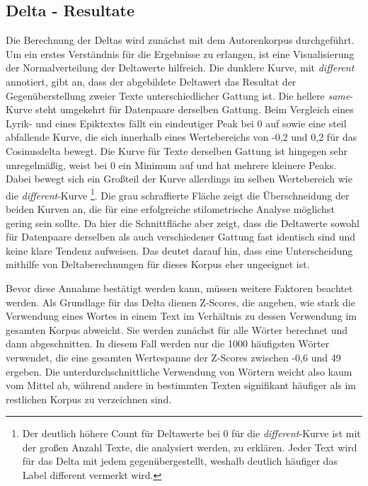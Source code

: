 \documentclass[a4paper,10p]{article}
\begin{document}
\subsection{Delta - Resultate}

Die Berechnung der Deltas wird zunächst mit dem Autorenkorpus durchgeführt. Um ein erstes Verständnis für die Ergebnisse zu erlangen, ist eine Visualisierung der Normalverteilung der Deltawerte hilfreich. Die dunklere Kurve, mit \textit{different} annotiert, gibt an, dass der abgebildete Deltawert das Resultat der Gegenüberstellung zweier Texte unterschiedlicher Gattung ist. Die hellere \textit{same}-Kurve steht umgekehrt für Datenpaare derselben Gattung. Beim Vergleich eines Lyrik- und eines Epiktextes fällt ein eindeutiger Peak bei 0 auf sowie eine steil abfallende Kurve, die sich innerhalb eines Wertebereichs von -0,2 und 0,2 für das Cosinusdelta bewegt. Die Kurve für Texte derselben Gattung ist hingegen sehr unregelmäßig, weist bei 0 ein Minimum auf und hat mehrere kleinere Peaks. Dabei bewegt sich ein Großteil der Kurve allerdings im selben Wertebereich wie die \textit{different}-Kurve \footnote{Der deutlich höhere Count für Deltawerte bei 0 für die \textit{different}-Kurve ist mit der großen Anzahl Texte, die analysiert werden, zu erklären. Jeder Text wird für das Delta mit jedem gegenübergestellt, weshalb deutlich häufiger das Label \glqq different \grqq vermerkt wird.}. Die grau schraffierte Fläche zeigt die Überschneidung der beiden Kurven an, die für eine erfolgreiche stilometrische Analyse möglichst gering sein sollte. Da hier die Schnittfläche aber zeigt, dass die Deltawerte sowohl für Datenpaare derselben als auch verschiedener Gattung fast identisch sind und keine klare Tendenz aufweisen. Das deutet darauf hin, dass eine Unterscheidung mithilfe von Deltaberechnungen für dieses Korpus eher ungeeignet ist. \par 

Bevor diese Annahme bestätigt werden kann, müssen weitere Faktoren beachtet werden. Als Grundlage für das Delta dienen Z-Scores, die angeben, wie stark die Verwendung eines Wortes in einem Text im Verhältnis zu dessen Verwendung im gesamten Korpus abweicht. Sie werden zunächst für alle Wörter berechnet und dann abgeschnitten. In diesem Fall werden nur die 1000 häufigsten Wörter verwendet, die eine gesamten Wertespanne der Z-Scores zwischen -0,6 und 49 ergeben. Die unterdurchschnittliche Verwendung von Wörtern weicht also kaum vom Mittel ab, während andere in bestimmten Texten signifikant häufiger als im restlichen Korpus zu verzeichnen sind. \par 
\end{document}
